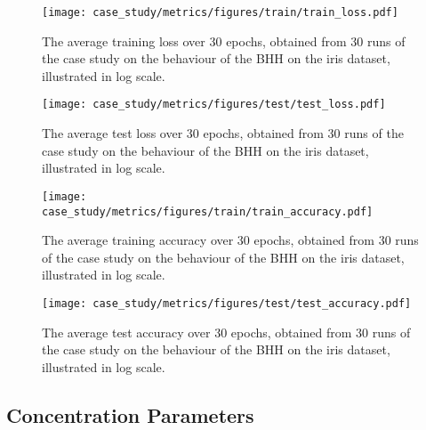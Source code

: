 \begin{figure}[htpb]
	\centering
	\texttt{[image: case\_study/metrics/figures/train/train\_loss.pdf]}
	\caption{The average training loss over 30 epochs, obtained from 30 runs of the case study on the behaviour of the \acs{BHH} on the iris dataset, illustrated in log scale.}
	\label{fig:results:case_study:train_loss}
\end{figure}

\begin{figure}[htpb]
	\centering
	\texttt{[image: case\_study/metrics/figures/test/test\_loss.pdf]}
	\caption{The average test loss over 30 epochs, obtained from 30 runs of the case study on the behaviour of the \acs{BHH} on the iris dataset, illustrated in log scale.}
	\label{fig:results:case_study:test_loss}
\end{figure}

\begin{figure}[htpb]
	\centering
	\texttt{[image: case\_study/metrics/figures/train/train\_accuracy.pdf]}
	\caption{The average training accuracy over 30 epochs, obtained from 30 runs of the case study on the behaviour of the \acs{BHH} on the iris dataset, illustrated in log scale.}
	\label{fig:results:case_study:train_accuracy}
\end{figure}

\begin{figure}[htpb]
	\centering
	\texttt{[image: case\_study/metrics/figures/test/test\_accuracy.pdf]}
	\caption{The average test accuracy over 30 epochs, obtained from 30 runs of the case study on the behaviour of the \acs{BHH} on the iris dataset, illustrated in log scale.}
	\label{fig:results:case_study:test_accuracy}
\end{figure}



\subsection{Concentration Parameters}\label{sec:results:case_study:concentration_parameters}

